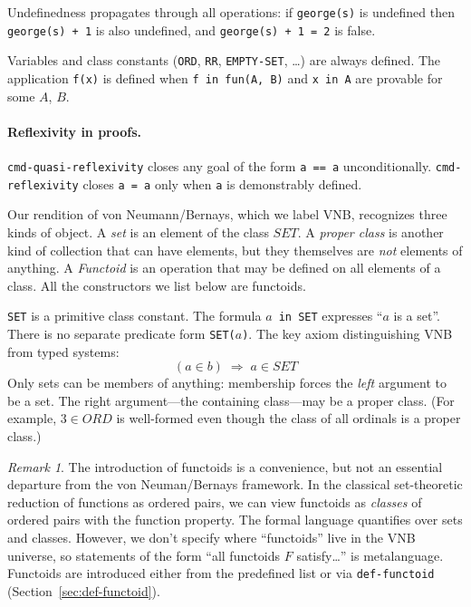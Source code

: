 \documentclass{amsbook}[openany]
\theoremstyle{definition}
\theoremstyle{remark}
\newtheorem{remark}{Remark}[chapter]
\theoremstyle{remark}
\begin{document}
\noindent
Undefinedness propagates through all operations: if \texttt{george(s)}
is undefined then \texttt{george(s) + 1} is also undefined,
and \texttt{george(s) + 1 = 2} is false.

Variables and class constants (\texttt{ORD}, \texttt{RR},
\texttt{EMPTY-SET}, \ldots) are always defined.  The application
\texttt{f(x)} is defined when \texttt{f in fun(A, B)} and
\texttt{x in A} are provable for some $A$, $B$.

\paragraph{Reflexivity in proofs.}
\texttt{cmd-quasi-reflexivity} closes any goal of the form
\texttt{a == a} unconditionally.
\texttt{cmd-reflexivity} closes \texttt{a = a} only when \texttt{a} is
demonstrably defined.

Our rendition of von Neumann/Bernays, which we label VNB, recognizes
three kinds of object.  A \emph{set} is an element of the class
$\mathit{SET}$.  A \emph{proper class} is another kind of collection
that can have elements, but they themselves are \emph{not} elements of
anything.  A \emph{Functoid} is an operation that may be defined on
all elements of a class.  All the constructors we list below are
functoids.

\texttt{SET} is a primitive class constant.  The formula
\texttt{$a$ in SET} expresses ``$a$ is a set''.
There is no separate predicate form \texttt{SET($a$)}.
%
The key axiom distinguishing VNB from typed systems:
\[
  (a \in b) \;\Longrightarrow\; a \in \mathit{SET}
\]
Only sets can be members of anything: membership forces the \emph{left}
argument to be a set.  The right argument---the containing class---may be
a proper class.  (For example, $3 \in \mathit{ORD}$ is well-formed even
though the class of all ordinals is a proper class.)

\label{sec:class-set-discipline}


\begin{remark}\label{remark:27137-54738-896234}
%
The introduction of functoids is a convenience, but not an essential
departure from the von Neuman/Bernays framework. In the classical
set-theoretic reduction of functions as ordered pairs, we can view
functoids as \emph{classes} of ordered pairs with the function
property.  The formal language quantifies over sets and classes.
However, we don't specify where ``functoids'' live in the VNB
universe, so statements of the form ``all functoids $F$
satisfy\ldots'' is metalanguage.  Functoids are introduced either from
the predefined list or via \texttt{def-functoid}
(Section~\ref{sec:def-functoid}).

%
\end{remark}
\end{document}
